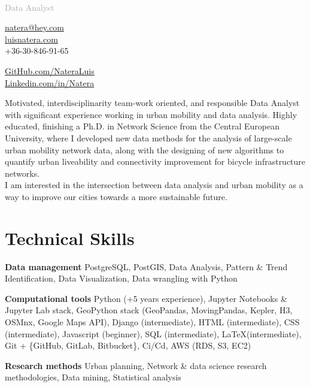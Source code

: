 \documentclass{academiccv}
\begin{document}
\raggedright

\namefont{\myname}\\
\vspace{1em}
\textcolor{darkgray}{{\Large Data Analyst}}

\vspace{1em}
\begin{minipage}[t]{0.495\textwidth}
  \href{mailto:natera@hey.com}{natera@hey.com}\\
  \href{https://luisnatera.com}{luisnatera.com} \\
  +36-30-846-91-65
\end{minipage}
\begin{minipage}[t]{0.495\textwidth}
	\href{https://github.com/nateraluis}{GitHub.com/NateraLuis}\\
	\href{https://www.linkedin.com/in/natera/}{Linkedin.com/in/Natera} \\
	
  \end{minipage}
\vspace{2.5em}

Motivated, interdisciplinarity team-work oriented, and responsible Data Analyst with significant experience working in urban mobility and data analysis. Highly educated, finishing a Ph.D. in Network Science from the Central European University, where I developed new data methods for the analysis of large-scale urban mobility network data, along with the designing of new algorithms to quantify urban liveability and connectivity improvement for bicycle infrastructure networks.\\
I am interested in the intersection between data analysis and urban mobility as a way to improve our cities towards a more sustainable future.

\section*{Technical Skills}
\begin{list}{}{}
	\item[\textbf{Data management}] \tab PostgreSQL, PostGIS, Data Analysis, Pattern \& Trend Identification, Data Visualization, Data wrangling with Python 
	\item[\textbf{Computational tools}] \tab Python (+5 years experience), Jupyter Notebooks \& Jupyter Lab stack, GeoPython stack (GeoPandas, MovingPandas, Kepler, H3, OSMnx, Google Maps API), Django (intermediate), HTML (intermediate), CSS (intermediate), Javascript (beginner), SQL (intermediate), \LaTeX (intermediate), Git + \{GitHub, GitLab, Bitbucket\}, Ci/Cd, AWS (RDS, S3, EC2)
	\item[\textbf{Research methods}] \tab Urban planning, Network \& data science research methodologies, Data mining, Statistical analysis
\end{list}
\end{document}
